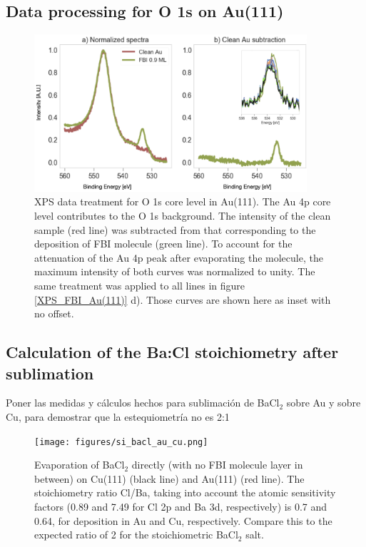 \documentclass[aps,prl,reprint,longbibliography,superscriptaddress]{revtex4-1}
\def\BaCl{BaCl$_2$ }
\newcommand{\completar}[1]{{\color{red} #1}}
\begin{document}
\subsection{Data processing for O 1s on Au(111)}
\begin{figure}[ht!]
	\includegraphics[width=0.9\textwidth]{figures/si_au_subtraction.png}
	\caption{\label{Au_subtraction} 
    XPS data treatment for O 1s core level in Au(111). The Au 4p core level contributes to the O 1s background. The intensity of the clean sample (red line) was subtracted from that corresponding to the deposition of FBI molecule (green line). To account for the attenuation of the Au 4p peak after evaporating the molecule, the maximum intensity of both curves was normalized to unity. The same treatment was applied to all lines in figure \ref{XPS_FBI_Au(111)} d). Those curves are shown here as inset with no offset.}
\end{figure}  

\subsection{Calculation of the Ba:Cl stoichiometry after sublimation}
\completar{Poner las medidas y cálculos hechos para sublimación de \BaCl sobre Au y sobre Cu, para demostrar que la estequiometría no es 2:1}
\begin{figure}[ht!]
	\texttt{[image: figures/si\_bacl\_au\_cu.png]}
	\caption{\label{Chlorine_desorption} 
    Evaporation of \BaCl directly (with no FBI molecule layer in between) on Cu(111) (black line) and Au(111) (red line). The stoichiometry ratio Cl/Ba, taking into account the atomic sensitivity factors (0.89 and 7.49 for Cl 2p and Ba 3d, respectively) is 0.7 and 0.64, for deposition in Au and Cu, respectively. Compare this to the expected ratio of 2 for the stoichiometric \BaCl salt.}
\end{figure}  
\end{document}

